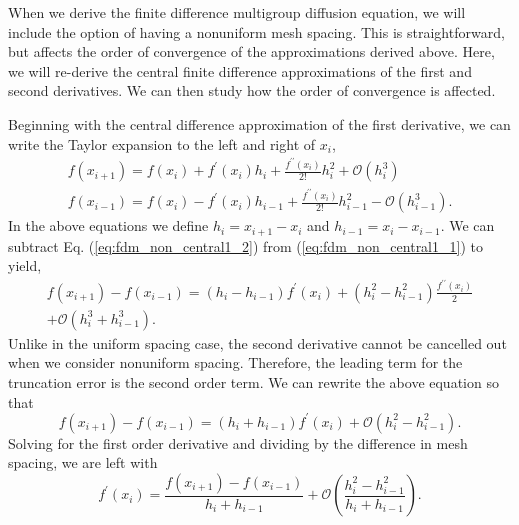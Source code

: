 When we derive the finite difference multigroup diffusion equation, we will include the option of having a nonuniform
mesh spacing.  This is straightforward, but affects the order of convergence of the approximations derived above.  Here,
we will re-derive the central finite difference approximations of the first and second derivatives.  We can then study how
the order of convergence is affected.
\par
Beginning with the central difference approximation of the first derivative, we can write the Taylor expansion to the left and
right of $x_i$,
\begin{eqnarray}
    f\left(x_{i+1}\right) = f\left(x_{i}\right) + f^{\prime}\left(x_{i}\right)h_{i} + \frac{f^{\prime\prime}\left(x_{i}\right)}{2!}h^{2}_{i} + \mathcal{O}\left(h^{3}_{i}\right) \\
  \label{eq:fdm_non_central1_1}
    f\left(x_{i-1}\right) = f\left(x_{i}\right) - f^{\prime}\left(x_{i}\right)h_{i-1} + \frac{f^{\prime\prime}\left(x_{i}\right)}     {2!}h^{2}_{i-1} - \mathcal{O}\left(h^{3}_{i-1}\right).
  \label{eq:fdm_non_central1_2}
\end{eqnarray}
In the above equations we define $h_{i} = x_{i+1} - x_{i}$ and $h_{i-1} = x_{i} - x_{i-1}$.  We can subtract Eq. 
(\ref{eq:fdm_non_central1_2}) from (\ref{eq:fdm_non_central1_1}) to yield,
\begin{eqnarray}
     f\left(x_{i+1}\right) -  f\left(x_{i-1}\right) = \left(h_{i} - h_{i-1}\right) f^{\prime}\left(x_{i}\right) + 
     \left(h^{2}_{i} - h^{2}_{i-1}\right)\frac{f^{\prime\prime}\left(x_{i}\right)}{2} \\ + \mathcal{O}\left(h^{3}_{i} +
      h^{3}_{i-1}\right). \nonumber
\end{eqnarray}
Unlike in the uniform spacing case, the second derivative cannot be cancelled out when we consider nonuniform spacing.
Therefore, the leading term for the truncation error is the second order term. We can rewrite the above equation so 
that
\begin{equation}
     f\left(x_{i+1}\right) -  f\left(x_{i-1}\right) = \left(h_{i} + h_{i-1}\right) f^{\prime}\left(x_{i}\right) + 
      \mathcal{O}\left(h^{2}_{i} - h^{2}_{i-1}\right).
\end{equation}
Solving for the first order derivative and dividing by the difference in mesh spacing, we are left with
\begin{equation}
     f^{\prime}\left(x_{i}\right) = \frac{f\left(x_{i+1}\right) -  f\left(x_{i-1}\right)}{h_{i} + h_{i-1}} +  
     \mathcal{O}\left(\frac{h^{2}_{i} - h^{2}_{i-1}}{h_{i} + h_{i-1}}\right).
\end{equation}
